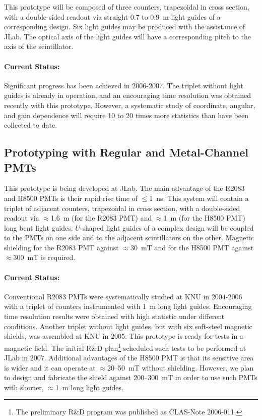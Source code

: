 \documentclass[12pt]{article}
\begin{document}
This prototype will be composed of three counters, trapezoidal in cross 
section, with a double-sided readout via straight 0.7 to 0.9~m light guides
of a corresponding design.  Six light guides may be produced with the 
assistance of JLab.  The optical axis of the light guides will have a 
corresponding pitch to the axis of the scintillator.

\paragraph{Current Status:}  Significant progress has been achieved in 
2006-2007.  The triplet without light guides is already in operation, and
an encouraging time resolution was obtained recently with this prototype.  
However, a systematic study of coordinate, angular, and gain dependence 
will require 10 to 20 times more statistics than have been collected to
date.

\subsection{Prototyping with Regular and Metal-Channel PMTs}

This prototype is being developed at JLab.  The main advantage of the R2083 
and H8500 PMTs is their rapid rise time of $\le$1~ns.  This system will
contain a triplet of adjacent counters, trapezoidal in cross section, with a 
double-sided readout via $\approx$1.6~m (for the R2083 PMT) and $\approx$1~m
(for the H8500 PMT) long bent light guides.  $U$-shaped light guides of a 
complex design will be coupled to the PMTs on one side and to the adjacent 
scintillators on the other.  Magnetic shielding for the R2083 PMT against
$\approx$30~mT and for the H8500 PMT against $\approx 300$~mT is required.

\paragraph{Current Status:}  Conventional R2083 PMTs were systematically 
studied at KNU in 2004-2006 with a triplet of counters instrumented with 
1~m long light guides. Encouraging time resolution results were obtained 
with high statistic under different conditions.  Another triplet without 
light guides, but with six soft-steel magnetic shields, was assembled at 
KNU in 2005.  This prototype is ready for tests in a magnetic field.  The 
initial R\&D plan\footnote{The preliminary R\&D program was published as 
CLAS-Note 2006-011.} scheduled such tests to be performed at JLab in 2007. 
Additional advantages of the H8500 PMT is that its sensitive area is wider 
and it can operate at $\approx$20--50~mT without shielding.  However, we plan 
to design and fabricate the shield against 200--300~mT in order to use such 
PMTs with shorter, $\approx$1~m long light guides.
 
\end{document}

